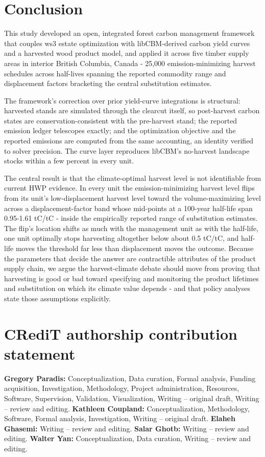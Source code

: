 \documentclass[preprint,12pt,authoryear]{elsarticle}
\begin{document}
\begin{linenumbers}
\section{Conclusion}
\label{sec:conclusion}

This study developed an open, integrated forest carbon management framework that couples \ac{ws3} estate optimization with libCBM-derived carbon yield curves and a harvested wood product model, and applied it across five timber supply areas in interior British Columbia, Canada - 25,000 emission-minimizing harvest schedules across half-lives spanning the reported commodity range and displacement factors bracketing the central substitution estimates.

The framework's correction over prior yield-curve integrations is structural: harvested stands are simulated through the clearcut itself, so post-harvest carbon states are conservation-consistent with the pre-harvest stand; the reported emission ledger telescopes exactly; and the optimization objective and the reported emissions are computed from the same accounting, an identity verified to solver precision. The curve layer reproduces libCBM's no-harvest landscape stocks within a few percent in every unit.

The central result is that the climate-optimal harvest level is not identifiable from current \ac{HWP} evidence. In every unit the emission-minimizing harvest level flips from its unit's low-displacement harvest level toward the volume-maximizing level across a displacement-factor band whose mid-points at a 100-year half-life span 0.95-1.61 tC/tC - inside the empirically reported range of substitution estimates. The flip's location shifts as much with the management unit as with the half-life, one unit optimally stops harvesting altogether below about 0.5 tC/tC, and half-life moves the threshold far less than displacement moves the outcome. Because the parameters that decide the answer are contractible attributes of the product supply chain, we argue the harvest-climate debate should move from proving that harvesting is good or bad toward specifying and monitoring the product lifetimes and substitution on which its climate value depends - and that policy analyses state those assumptions explicitly.
\newpage



\section*{CRediT authorship contribution statement}
\label{sec: CRediT}
\textbf{Gregory Paradis:} Conceptualization, Data curation, Formal analysis, Funding acquisition, Investigation, Methodology, Project administration, Resources, Software, Supervision, Validation, Visualization, Writing -- original draft, Writing -- review and editing. \textbf{Kathleen Coupland:} Conceptualization, Methodology, Software, Formal analysis, Investigation, Writing -- original draft. \textbf{Elaheh Ghasemi:} Writing -- review and editing. \textbf{Salar Ghotb:} Writing -- review and editing. \textbf{Walter Yan:} Conceptualization, Data curation, Writing -- review and editing.



\end{linenumbers}
\end{document}
